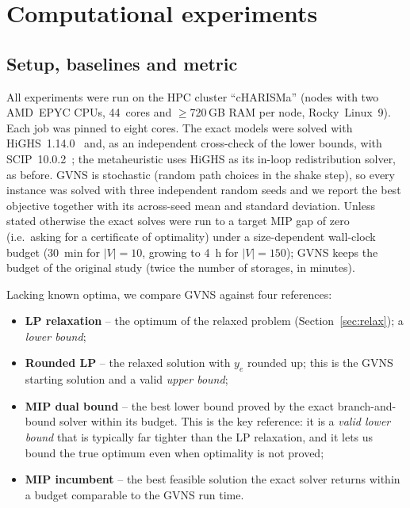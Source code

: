 
\section{Computational experiments}
\label{sec:experiments}

\subsection{Setup, baselines and metric}
All experiments were run on the HPC cluster ``cHARISMa'' (nodes with two
AMD~EPYC CPUs, 44~cores and $\ge$720\,GB RAM per node, Rocky~Linux~9). Each job
was pinned to eight cores. The exact models were solved with
HiGHS~1.14.0~\cite{highs} and, as an independent cross-check of the lower
bounds, with SCIP~10.0.2~\cite{scip}; the metaheuristic uses HiGHS as its
in-loop redistribution solver, as before. GVNS is stochastic (random path
choices in the shake step), so every instance was solved with three independent
random seeds and we report the best objective together with its across-seed
mean and standard deviation. Unless stated otherwise the exact solves were run
to a target MIP gap of zero (i.e.\ asking for a certificate of optimality) under
a size-dependent wall-clock budget (30~min for $|V|=10$, growing to 4~h for
$|V|=150$); GVNS keeps the budget of the original study (twice the number of
storages, in minutes).

Lacking known optima, we compare GVNS against four references:
\begin{itemize}[leftmargin=1.4em,itemsep=1pt,topsep=2pt]
\item \textbf{LP relaxation} -- the optimum of the relaxed problem
      (Section~\ref{sec:relax}); a \emph{lower bound};
\item \textbf{Rounded LP} -- the relaxed solution with $y_e$ rounded up; this is
      the GVNS starting solution and a valid \emph{upper bound};
\item \textbf{MIP dual bound} -- the best lower bound proved by the exact
      branch-and-bound solver within its budget. This is the key reference: it
      is a \emph{valid lower bound} that is typically far tighter than the LP
      relaxation, and it lets us bound the true optimum even when optimality is
      not proved;
\item \textbf{MIP incumbent} -- the best feasible solution the exact solver
      returns within a budget comparable to the GVNS run time.
\end{itemize}

